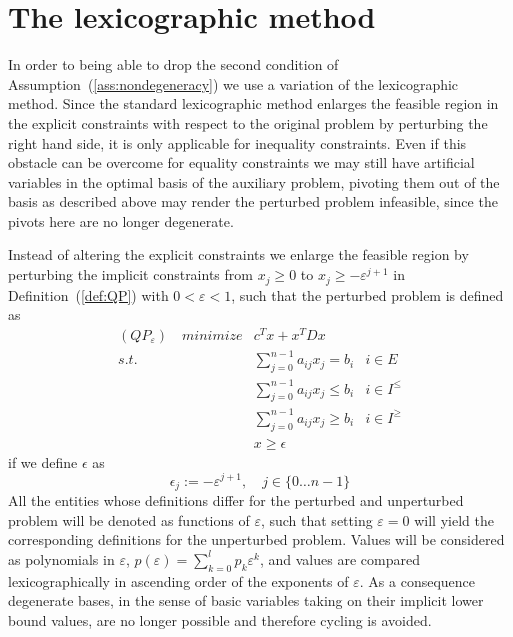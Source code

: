 \documentclass[a4paper]{article}
\begin{document}
\section{The lexicographic method}
In order to being able to drop the second condition of
Assumption~(\ref{ass:nondegeneracy}) we use a variation of the lexicographic
method. Since the standard lexicographic method enlarges the feasible region
in the explicit constraints with respect to the original problem by perturbing
the right hand side, it is only applicable for inequality
constraints. Even if this obstacle can be overcome for equality constraints we
may still have artificial variables in the optimal basis of the auxiliary
problem, pivoting them out of the basis as described above may render the
perturbed problem infeasible, since the pivots here are no longer degenerate.

Instead of altering the explicit constraints we enlarge the feasible region by
perturbing the implicit constraints from $x_{j} \geq 0$ to $x_{j} \geq
-\varepsilon^{j +1}$ in Definition~(\ref{def:QP}) with $0 < \varepsilon < 1$,
such that the perturbed problem is defined as
\begin{eqnarray}
\label{def:QP_eps}
(QP_{\varepsilon})\quad minimize&  c^{T}x + x^{T} D x   & \nonumber \\
s.t.	 & \sum_{j=0}^{n-1}a_{ij}x_{j} = b_{i}	& i \in E \nonumber \\
	 & \sum_{j=0}^{n-1}a_{ij}x_{j} \leq b_{i} & i \in I^{\leq} \\
	 & \sum_{j=0}^{n-1}a_{ij}x_{j} \geq b_{i} & i \in I^{\geq} \nonumber \\
	 & x \geq \epsilon				& \nonumber  
\end{eqnarray}
if we define $\epsilon$ as
\begin{equation}
\label{def:epsilon}
\epsilon_{j}:= -\varepsilon^{j+1}, \quad j \in \{0 \dots n-1 \}
\end{equation}
All the entities whose definitions differ for the perturbed and
unperturbed problem  will be denoted as functions of $\varepsilon$,
such that setting $\varepsilon =0$ will yield the corresponding definitions
for the unperturbed problem.
Values will be considered as polynomials in $\varepsilon$,
$p(\varepsilon)=\sum_{k=0}^{l}p_{k}\varepsilon^{k}$, and values are compared
lexicographically in ascending order of the exponents of $\varepsilon$. As
a consequence degenerate bases, in the sense of basic variables taking on their
implicit lower bound values,
are no longer possible and therefore cycling is
avoided.   
\end{document}

